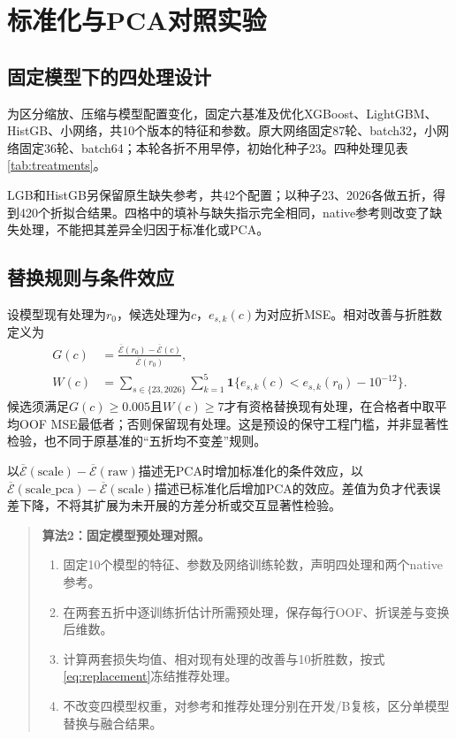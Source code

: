 \section{标准化与PCA对照实验}\label{sec:preprocessing}

\subsection{固定模型下的四处理设计}
为区分缩放、压缩与模型配置变化，固定六基准及优化XGBoost、LightGBM、HistGB、小网络，共10个版本的特征和参数。原大网络固定87轮、batch32，小网络固定36轮、batch64；本轮各折不用早停，初始化种子23。四种处理见表\ref{tab:treatments}。


LGB和HistGB另保留原生缺失参考，共42个配置；以种子23、2026各做五折，得到420个折拟合结果。四格中的填补与缺失指示完全相同，native参考则改变了缺失处理，不能把其差异全归因于标准化或PCA。

\subsection{替换规则与条件效应}
设模型现有处理为$r_0$，候选处理为$c$，$e_{s,k}(c)$为对应折MSE。相对改善与折胜数定义为
\begin{equation}
\begin{aligned}
G(c)&=\frac{\overline{\mathcal E}(r_0)-\overline{\mathcal E}(c)}{\overline{\mathcal E}(r_0)},\\
W(c)&=\sum_{s\in\{23,2026\}}\sum_{k=1}^{5}
\mathbf1\{e_{s,k}(c)<e_{s,k}(r_0)-10^{-12}\}.
\end{aligned}
\label{eq:replacement}
\end{equation}
候选须满足$G(c)\ge0.005$且$W(c)\ge7$才有资格替换现有处理，在合格者中取平均OOF MSE最低者；否则保留现有处理。这是预设的保守工程门槛，并非显著性检验，也不同于原基准的“五折均不变差”规则。

以$\overline{\mathcal E}(\mathrm{scale})-\overline{\mathcal E}(\mathrm{raw})$描述无PCA时增加标准化的条件效应，以$\overline{\mathcal E}(\mathrm{scale\_pca})-\overline{\mathcal E}(\mathrm{scale})$描述已标准化后增加PCA的效应。差值为负才代表误差下降，不将其扩展为未开展的方差分析或交互显著性检验。

\begin{quote}
\textbf{算法2：固定模型预处理对照。}
\begin{enumerate}
\item 固定10个模型的特征、参数及网络训练轮数，声明四处理和两个native参考。
\item 在两套五折中逐训练折估计所需预处理，保存每行OOF、折误差与变换后维数。
\item 计算两套损失均值、相对现有处理的改善与10折胜数，按式\eqref{eq:replacement}冻结推荐处理。
\item 不改变四模型权重，对参考和推荐处理分别在开发/B复核，区分单模型替换与融合结果。
\end{enumerate}
\end{quote}

